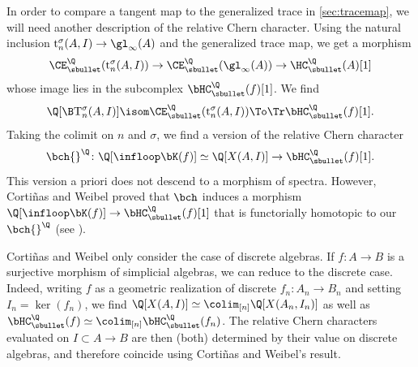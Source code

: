 In order to compare a tangent map to the generalized trace in \autoref{sec:tracemap}, we will need another description of the relative Chern character.
Using the natural inclusion $\mathrm{t}^\sigma_n(A,I) \to \gl_\infty(A)$ and the generalized trace map, we get a morphism
\[
\CE_\sbullet^\Q(\mathrm{t}^\sigma_n(A,I)) \to \CE_\sbullet^\Q(\gl_\infty(A)) \to \HC_\sbullet^\Q(A)[1]
\]
whose image lies in the subcomplex $\bHC_\sbullet^\Q(f)[1]$. We find
\[
\Q[\B \mathrm{T}^\sigma_n(A,I)] \isom \CE_\sbullet^\Q(\mathrm{t}^\sigma_n(A,I)) \To\Tr \bHC_\sbullet^\Q(f)[1].
\]
Taking the colimit on $n$ and $\sigma$, we find a version of the relative Chern character
\[
\bch{}^\Q \colon \Q[\infloop \bK(f)] \simeq \Q[X(A,I)] \to \bHC_\sbullet^\Q(f)[1].
\]
This version a priori does not descend to a morphism of spectra. However, Cortiñas and Weibel proved that $\bch$ induces a morphism $\Q[\infloop \bK(f)] \to \bHC_\sbullet^\Q(f)[1]$ that is functorially homotopic to our $\bch{}^\Q$ (see \cite{cortinasweibel:relative}).
\begin{rmq}\label{rmq:relChern}
Cortiñas and Weibel only consider the case of discrete algebras. If $f \colon A \to B$ is a surjective morphism of simplicial algebras, we can reduce to the discrete case. Indeed, writing $f$ as a geometric realization of discrete $f_n \colon A_n \to B_n$ and setting $I_n = \ker(f_n)$, we find $\Q[X(A,I)] \simeq \colim_{[n]} \Q[X(A_n,I_n)]$ as well as $\bHC_\sbullet^\Q(f) \simeq \colim_{[n]} \bHC_\sbullet^\Q(f_n)$.
The relative Chern characters evaluated on $I \subset A \to B$ are then (both) determined by their value on discrete algebras, and therefore coincide using Cortiñas and Weibel's result.
\end{rmq}


